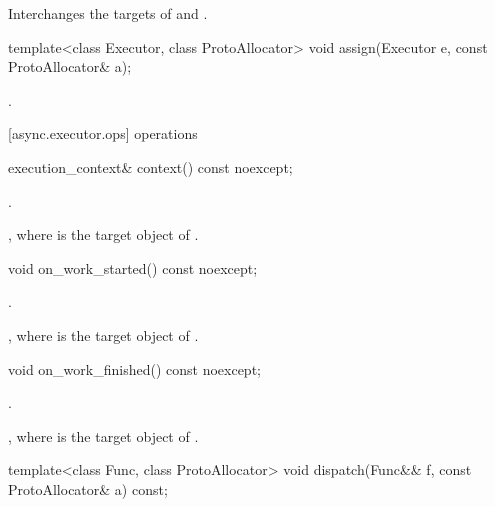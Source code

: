 \begin{itemdescr}
\pnum
\effects Interchanges the targets of  and .
\end{itemdescr}

\begin{itemdecl}
template<class Executor, class ProtoAllocator>
  void assign(Executor e, const ProtoAllocator& a);
\end{itemdecl}

\begin{itemdescr}
\pnum
\effects {}.
\end{itemdescr}



[async.executor.ops]{ operations}

\begin{itemdecl}
execution_context& context() const noexcept;
\end{itemdecl}

\begin{itemdescr}
\pnum
\requires {}.

\pnum
\returns {}, where  is the target object of .
\end{itemdescr}

\begin{itemdecl}
void on_work_started() const noexcept;
\end{itemdecl}

\begin{itemdescr}
\pnum
\requires {}.

\pnum
\effects {}, where  is the target object of .
\end{itemdescr}

\begin{itemdecl}
void on_work_finished() const noexcept;
\end{itemdecl}

\begin{itemdescr}
\pnum
\requires {}.

\pnum
\effects {}, where  is the target object of .
\end{itemdescr}

\begin{itemdecl}
template<class Func, class ProtoAllocator>
  void dispatch(Func&& f, const ProtoAllocator& a) const;
\end{itemdecl}

